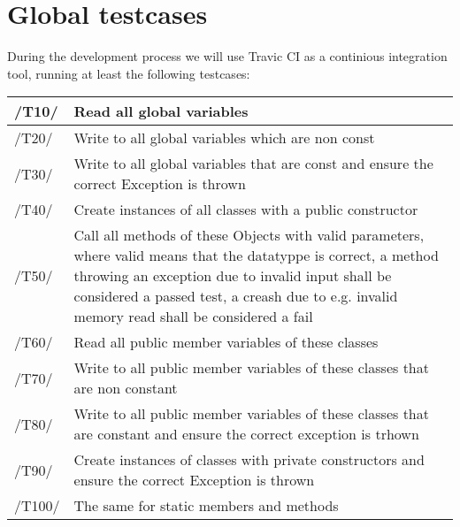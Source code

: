 \chapter{Global testcases}
During the development process we will use Travic CI as a continious integration tool, running at least the following testcases: \\

\begin{longtable}{|p{1cm} | p{15cm}|}
   \hline
  /T10/ & Read all global variables \\
  \hline
  /T20/ & Write to all global variables which are non const \\
  \hline
  /T30/ & Write to all global variables that are const and ensure the correct Exception is thrown \\
  \hline
  /T40/ & Create instances of all classes with a public constructor \\
  \hline
  /T50/ & Call all methods of these Objects with valid parameters, where valid means that the 	datatyppe is correct, a method throwing an exception due to invalid input shall be considered a passed test, a creash due to e.g. invalid memory read shall be considered a fail \\
  \hline
  /T60/ & Read all public member variables of these classes \\
  \hline
  /T70/ & Write to all public member variables of these classes that are non constant \\
  \hline
  /T80/ & Write to all public member variables of these classes that are constant and ensure the correct exception is trhown \\
  \hline
  /T90/ & Create instances of classes with private constructors and ensure the correct Exception is thrown \\
  \hline
  /T100/ &  The same for static members and methods \\
   \hline
\end{longtable}
